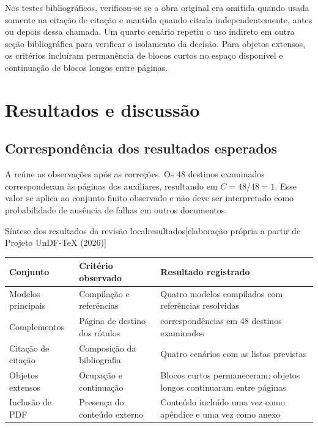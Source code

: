 Nos testes bibliográficos, verificou-se se a obra original era omitida quando
usada somente na citação de citação e mantida quando citada independentemente,
antes ou depois dessa chamada. Um quarto cenário repetiu o uso indireto em
outra seção bibliográfica para verificar o isolamento da decisão. Para objetos
extensos, os critérios incluíram permanência de blocos curtos no espaço
disponível e continuação de blocos longos entre páginas.

\section{Resultados e discussão}

\subsection{Correspondência dos resultados esperados}

A  reúne as observações após as correções. Os 48 destinos
examinados corresponderam às páginas dos auxiliares, resultando em
$C = 48/48 = 1$. Esse valor se aplica ao conjunto finito observado e não deve
ser interpretado como probabilidade de ausência de falhas em outros documentos.

\begin{undftabela}[htb]{Síntese dos resultados da revisão local}{resultados}[elaboração própria a partir de Projeto UnDF-TeX (2026)]
  \small
  \begin{tabular}{>{\raggedright\arraybackslash}p{}>{\raggedright\arraybackslash}p{}>{\raggedright\arraybackslash}p{}}
    \hline
    \textbf{Conjunto} & \textbf{Critério observado} & \textbf{Resultado registrado} \\
    \hline
    Modelos principais & Compilação e referências & Quatro modelos compilados com referências resolvidas \\
    Complementos & Página de destino dos rótulos & 48 correspondências em 48 destinos examinados \\
    Citação de citação & Composição da bibliografia & Quatro cenários com as listas previstas \\
    Objetos extensos & Ocupação e continuação & Blocos curtos permaneceram; objetos longos continuaram entre páginas \\
    Inclusão de PDF & Presença do conteúdo externo & Conteúdo incluído uma vez como apêndice e uma vez como anexo \\
    \hline
  \end{tabular}
\end{undftabela}

